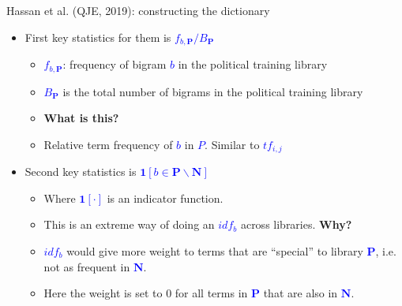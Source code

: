 \documentclass[english]{beamer}
\begin{document}
\begin{frame}{Hassan et al. (QJE, 2019): constructing the dictionary}
\begin{itemize}
\setlength{\itemsep}{1.2em}
\item First key statistics for them is \textcolor{blue}{$f_{b,\boldsymbol{P}}/B_{\boldsymbol{P}}$}
\vspace{3pt}
\begin{itemize}
\setlength{\itemsep}{0.6em}
\item \textcolor{blue}{$f_{b,\boldsymbol{P}}$}: frequency of bigram \textcolor{blue}{$b$} in the political training library
\item \textcolor{blue}{$B_{\boldsymbol{P}}$} is the total number of bigrams in the political training library
\item \textbf{What is this?}
\item Relative term frequency of \textcolor{blue}{$b$ }in \textcolor{blue}{$P$}. Similar to \textcolor{blue}{$tf_{i,j}$}
\end{itemize}

\pause

\item Second key statistics is \textcolor{blue}{$\boldsymbol{1}\left[ b\in \boldsymbol{P} \backslash \boldsymbol{N}\right]$}
\vspace{3pt}
\begin{itemize}
\setlength{\itemsep}{0.6em}
\item Where \textcolor{blue}{$\boldsymbol{1}\left[ \cdot \right]$} is an indicator function.
\item This is an extreme way of doing an \textcolor{blue}{$idf_{b}$} across libraries. \textbf{Why?}
\item \textcolor{blue}{$idf_{b}$} would give more weight to terms that are ``special'' to library \textcolor{blue}{$\boldsymbol{P}$}, i.e. not as frequent in \textcolor{blue}{$\boldsymbol{N}$}.
\item Here the weight is set to 0 for all terms in \textcolor{blue}{$\boldsymbol{P}$} that are also in \textcolor{blue}{$\boldsymbol{N}$}.
\end{itemize}
\end{itemize}
\end{frame}
\end{document}
